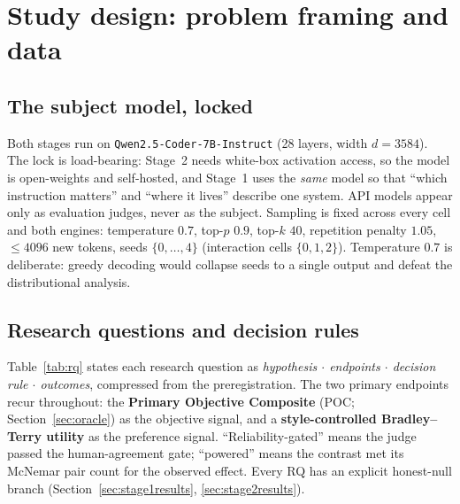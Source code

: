 \section{Study design: problem framing and data}
\label{sec:design}

\subsection{The subject model, locked}
Both stages run on \texttt{Qwen2.5-Coder-7B-Instruct} \citep{hui2024qwencoder} (28 layers, width
$d=3584$). The lock is
load-bearing: Stage~2 needs white-box activation access, so the model is open-weights and
self-hosted, and Stage~1 uses the \emph{same} model so that ``which instruction matters'' and
``where it lives'' describe one system. API models appear only as evaluation judges, never as
the subject. Sampling is fixed across every cell and both engines: temperature $0.7$,
top-$p$ $0.9$, top-$k$ $40$, repetition penalty $1.05$, $\le 4096$ new tokens, seeds
$\{0,\dots,4\}$ (interaction cells $\{0,1,2\}$). Temperature $0.7$ is deliberate: greedy
decoding would collapse seeds to a single output and defeat the distributional analysis.

\subsection{Research questions and decision rules}
Table~\ref{tab:rq} states each research question as \emph{hypothesis $\cdot$ endpoints $\cdot$
decision rule $\cdot$ outcomes}, compressed from the preregistration. The two primary endpoints
recur throughout: the \textbf{Primary Objective Composite} (POC; Section~\ref{sec:oracle}) as
the objective signal, and a \textbf{style-controlled Bradley--Terry utility} as the preference
signal. ``Reliability-gated'' means the judge passed the human-agreement gate; ``powered''
means the contrast met its McNemar pair count for the observed effect. Every RQ has an explicit
honest-null branch (Section~\ref{sec:stage1results}, \ref{sec:stage2results}).


